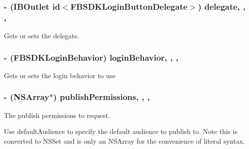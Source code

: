 \subsubsection[{delegate}]{\setlength{\rightskip}{0pt plus 5cm}-\/ (I\+B\+Outlet id$<${\bf F\+B\+S\+D\+K\+Login\+Button\+Delegate}$>$) delegate\hspace{0.3cm}{\ttfamily [read]}, {\ttfamily [write]}, {\ttfamily [nonatomic]}, {\ttfamily [weak]}}\label{interface_f_b_s_d_k_login_button_a9334392431c0fb78a08fe4038a2a30fb}
Gets or sets the delegate. \hypertarget{interface_f_b_s_d_k_login_button_afe30ee6f02e53feb1185bea33b5afd8e}{}
\subsubsection[{login\+Behavior}]{\setlength{\rightskip}{0pt plus 5cm}-\/ (F\+B\+S\+D\+K\+Login\+Behavior) login\+Behavior\hspace{0.3cm}{\ttfamily [read]}, {\ttfamily [write]}, {\ttfamily [nonatomic]}, {\ttfamily [assign]}}\label{interface_f_b_s_d_k_login_button_afe30ee6f02e53feb1185bea33b5afd8e}
Gets or sets the login behavior to use \hypertarget{interface_f_b_s_d_k_login_button_a7b546773564a1961a0e9403e6b48b286}{}
\subsubsection[{publish\+Permissions}]{\setlength{\rightskip}{0pt plus 5cm}-\/ (N\+S\+Array$\ast$) publish\+Permissions\hspace{0.3cm}{\ttfamily [read]}, {\ttfamily [write]}, {\ttfamily [nonatomic]}, {\ttfamily [copy]}}\label{interface_f_b_s_d_k_login_button_a7b546773564a1961a0e9403e6b48b286}
The publish permissions to request.

Use {\ttfamily default\+Audience} to specify the default audience to publish to. Note this is converted to N\+S\+Set and is only an N\+S\+Array for the convenience of literal syntax. \hypertarget{interface_f_b_s_d_k_login_button_a4086baec0d0b3203c6dd3b3d65d419f8}{}

